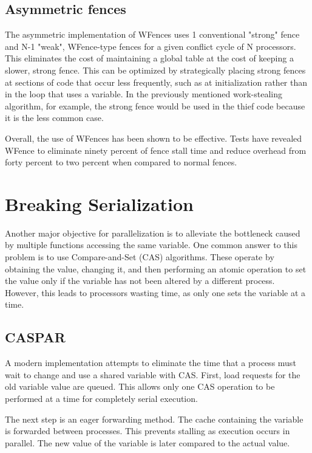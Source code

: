 \documentclass[twoside]{article}
\begin{document}
\subsection{Asymmetric fences}

The asymmetric implementation of WFences uses 1 conventional "strong" fence and N-1 "weak", WFence-type fences for a given conflict cycle of N processors. This eliminates the cost of maintaining a global table at the cost of keeping a slower, strong fence. This can be optimized by strategically placing strong fences at sections of code that occur less frequently, such as at initialization rather than in the loop that uses a variable. In the previously mentioned work-stealing algorithm, for example, the strong fence would be used in the thief code because it is the less common case.

Overall, the use of WFences has been shown to be effective. Tests have revealed WFence to eliminate ninety percent of fence stall time and reduce overhead from forty percent to two percent when compared to normal fences.

\section{Breaking Serialization}

Another major objective for parallelization is to alleviate the bottleneck caused by multiple functions accessing the same variable. One common answer to this problem is to use Compare-and-Set (CAS) algorithms. These operate by obtaining the value, changing it, and then performing an atomic operation to set the value only if the variable has not been altered by a different process. However, this leads to processors wasting time, as only one sets the variable at a time.

\subsection{CASPAR}

A modern implementation attempts to eliminate the time that a process must wait to change and use a shared variable with CAS. First, load requests for the old variable value are queued. This allows only one CAS operation to be performed at a time for completely serial execution.

The next step is an eager forwarding method. The cache containing the variable is forwarded between processes. This prevents stalling as execution occurs in parallel. The new value of the variable is later compared to the actual value.
\end{document}

